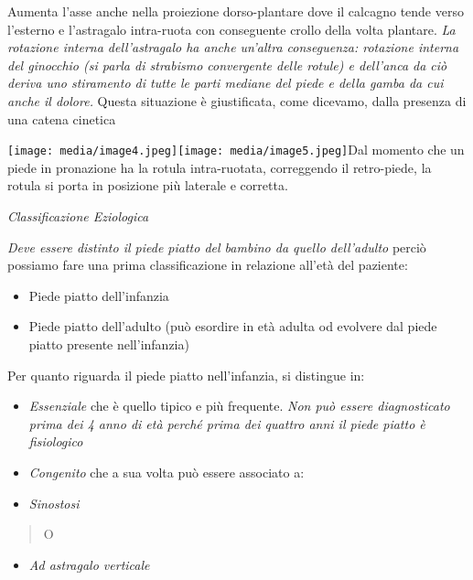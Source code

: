 \documentclass[]{article}
\begin{document}
Aumenta l'asse anche nella proiezione dorso-plantare dove il calcagno
tende verso l'esterno e l'astragalo intra-ruota con conseguente crollo
della volta plantare. \emph{La rotazione interna dell'astragalo ha anche
un'altra conseguenza: rotazione interna del ginocchio (\emph{si parla di
strabismo convergente delle rotule}) e dell'anca da ciò deriva uno
stiramento di tutte le parti mediane del piede e della gamba da cui
anche il dolore.} Questa situazione è giustificata, come dicevamo, dalla
presenza di una catena cinetica

\texttt{[image: media/image4.jpeg]}\texttt{[image: media/image5.jpeg]}Dal
momento che un piede in pronazione ha la rotula intra-ruotata,
correggendo il retro-piede, la rotula si porta in posizione più laterale
e corretta.

\emph{Classificazione Eziologica}

\emph{Deve essere distinto il piede piatto del bambino da quello
dell'adulto} perciò possiamo fare una prima classificazione in relazione
all'età del paziente:

\begin{itemize}
\item
  Piede piatto dell'infanzia
\item
  Piede piatto dell'adulto (può esordire in età adulta od evolvere dal
  piede piatto presente nell'infanzia)
\end{itemize}

Per quanto riguarda il piede piatto nell'infanzia, si distingue in:

\begin{itemize}
\item
  \emph{Essenziale} che è quello tipico e più frequente. \emph{Non può
  essere diagnosticato prima dei 4 anno di età perché prima dei quattro
  anni il piede piatto è fisiologico}
\item
  \emph{Congenito} che a sua volta può essere associato a:
\end{itemize}

\begin{itemize}
\item
  \emph{Sinostosi }
\end{itemize}

\begin{quote}
O
\end{quote}

\begin{itemize}
\item
  \emph{Ad astragalo verticale }
\end{itemize}
\end{document}
